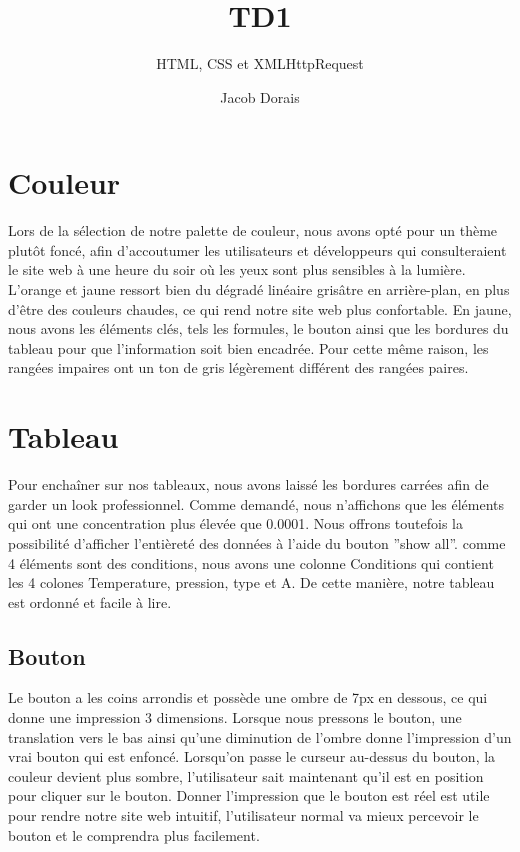 \documentclass{article}
\title{TD1}
\subtitle{HTML, CSS et XMLHttpRequest}
\author{Jacob Dorais}{Billy Bouchard}{B1}
\begin{document}
\maketitle

\section{Couleur}
\par
 Lors de la sélection de notre palette de couleur, nous avons opté pour un thème plutôt foncé, afin d'accoutumer les utilisateurs et développeurs qui consulteraient le site web à une heure du soir où les yeux sont plus sensibles à la lumière. L’orange et jaune ressort bien du dégradé linéaire grisâtre en arrière-plan, en plus d'être des couleurs chaudes, ce qui rend notre site web plus confortable. En jaune, nous avons les éléments clés, tels les formules, le bouton ainsi que les bordures du tableau pour que l'information soit bien encadrée. Pour cette même raison, les rangées impaires ont un ton de gris légèrement différent des rangées paires.
\section{Tableau}

\par

Pour enchaîner sur nos tableaux, nous avons laissé les bordures carrées afin de garder un look professionnel. Comme demandé, nous n'affichons que les éléments qui ont une concentration plus élevée que 0.0001. Nous offrons toutefois la possibilité d'afficher l'entièreté des données à l'aide du bouton ''show all''. comme 4 éléments sont des conditions, nous avons une colonne Conditions qui contient les 4 colones Temperature, pression, type et A. De cette manière, notre tableau est ordonné et facile à lire.

\subsection{Bouton}

\par

Le bouton a les coins arrondis et possède une ombre de 7px en dessous, ce qui donne une impression 3 dimensions. Lorsque nous pressons le bouton, une translation vers le bas ainsi qu'une diminution de l'ombre donne l'impression d'un vrai bouton qui est enfoncé. Lorsqu'on passe le curseur au-dessus du bouton, la couleur devient plus sombre, l'utilisateur sait maintenant qu'il est en position pour cliquer sur le bouton. Donner l'impression que le bouton est réel est utile pour rendre notre site web intuitif, l'utilisateur normal va mieux percevoir le bouton et le comprendra plus facilement.
\end{document}
